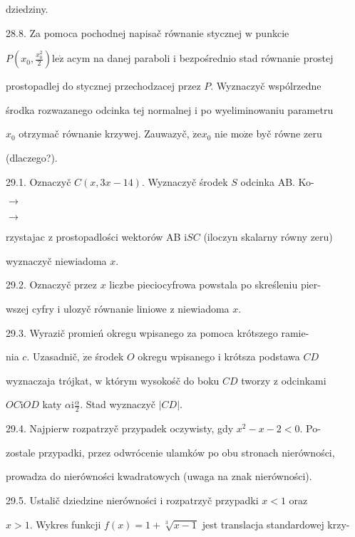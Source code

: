 \documentclass[a4paper,12pt]{article}
\begin{document}
dziedziny.

28.8. Za pomoca pochodnej napisač równanie stycznej $\mathrm{w}$ punkcie

$P(x_{0},\displaystyle \frac{x_{0}^{2}}{2}) \mathrm{l}\mathrm{e}\dot{\mathrm{z}}$ acym na danej paraboli $\mathrm{i}$ bezpośrednio stad równanie prostej

prostopadlej do stycznej przechodzacej przez $P$. Wyznaczyč wspólrzedne

środka rozwazanego odcinka tej normalnej $\mathrm{i}$ po wyeliminowaniu parametru

$x_{0}$ otrzymač równanie krzywej. Zauwazyč, $\dot{\mathrm{z}}\mathrm{e}x_{0}$ nie $\mathrm{m}\mathrm{o}\dot{\mathrm{z}}\mathrm{e}$ byč równe zeru

(dlaczego?).

29.1. Oznaczyč $C(x,3x-14)$. Wyznaczyč środek $S$ odcinka AB. Ko-

$\rightarrow$

$\rightarrow$

rzystajac $\mathrm{z}$ prostopadlości wektorów AB $\mathrm{i}SC$ (iloczyn skalarny równy zeru)

wyznaczyč niewiadoma $x.$

29.2. Oznaczyč przez $x$ liczbe pieciocyfrowa powstala po skreśleniu pier-

wszej cyfry $\mathrm{i}$ ulozyč równanie liniowe $\mathrm{z}$ niewiadoma $x.$

29.3. Wyrazič promień okregu wpisanego za pomoca krótszego ramie-

nia $c$. Uzasadnič, $\dot{\mathrm{z}}\mathrm{e}$ środek $O$ okregu wpisanego $\mathrm{i}$ krótsza podstawa $CD$

wyznaczaja trójkat, $\mathrm{w}$ którym wysokośč do boku $CD$ tworzy $\mathrm{z}$ odcinkami

$OC\mathrm{i}OD$ katy $\displaystyle \alpha \mathrm{i}\frac{\alpha}{2}$. Stad wyznaczyč $|CD|.$

29.4. Najpierw rozpatrzyč przypadek oczywisty, gdy $x^{2}-x-2<0$. Po-

zostale przypadki, przez odwrócenie ulamków po obu stronach nierówności,

prowadza do nierówności kwadratowych (uwaga na znak nierówności).

29.5. Ustalič dziedzine nierówności $\mathrm{i}$ rozpatrzyč przypadki $x< 1$ oraz

$x>1$. Wykres funkcji $f(x)=1+\sqrt[3]{x-1}$ jest translacja standardowej krzy-
\end{document}
